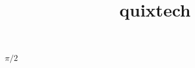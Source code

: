 \documentclass[12pt,a4paper]{article}
\title{quixtech}
\numberwithin{equation}{section}
\numberwithin{figure}{section}
\numberwithin{table}{section}
\begin{document}
$\pi / 2$
\end{document}
